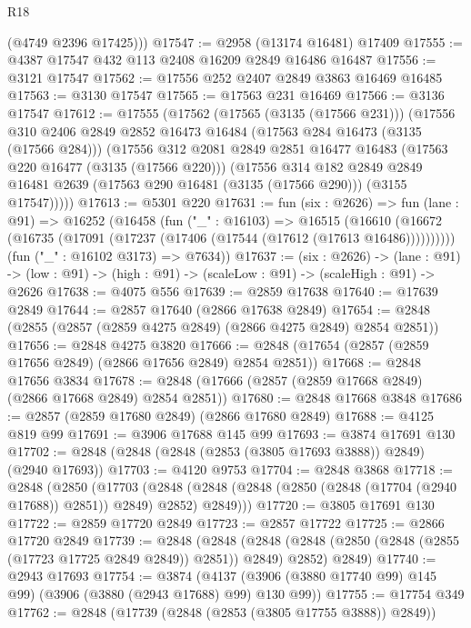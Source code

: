 \begin{lexlean}{R18}
\begin{coremodule}
        (@4749 @2396 @17425)))
@17547 := @2958 (@13174 @16481) @17409
@17555 := @4387 @17547 @432 @113 @2408 @16209 @2849 @16486 @16487
@17556 := @3121 @17547
@17562 := @17556 @252 @2407 @2849 @3863 @16469 @16485
@17563 := @3130 @17547
@17565 := @17563 @231 @16469
@17566 := @3136 @17547
@17612 := @17555
    (@17562
      (@17565 (@3135 (@17566 @231)))
      (@17556
        @310
        @2406
        @2849
        @2852
        @16473
        @16484
        (@17563 @284 @16473 (@3135 (@17566 @284)))
        (@17556
          @312
          @2081
          @2849
          @2851
          @16477
          @16483
          (@17563 @220 @16477 (@3135 (@17566 @220)))
          (@17556
            @314
            @182
            @2849
            @2849
            @16481
            @2639
            (@17563 @290 @16481 (@3135 (@17566 @290)))
            (@3155 @17547)))))
@17613 := @5301 @220
@17631 := fun (six : @2626) =>
  fun (lane : @91) =>
  @16252
    (@16458
      (fun ("_" : @16103) =>
      @16515
        (@16610 (@16672 (@16735 (@17091 (@17237 (@17406 (@17544 (@17612 (@17613 @16486))))))))))
      (fun ("_" : @16102 @3173) => @7634))
@17637 := (six : @2626) ->
  (lane : @91) -> (low : @91) -> (high : @91) -> (scaleLow : @91) -> (scaleHigh : @91) -> @2626
@17638 := @4075 @556
@17639 := @2859 @17638
@17640 := @17639 @2849
@17644 := @2857 @17640 (@2866 @17638 @2849)
@17654 := @2848 (@2855 (@2857 (@2859 @4275 @2849) (@2866 @4275 @2849) @2854 @2851))
@17656 := @2848 @4275 @3820
@17666 := @2848 (@17654 (@2857 (@2859 @17656 @2849) (@2866 @17656 @2849) @2854 @2851))
@17668 := @2848 @17656 @3834
@17678 := @2848 (@17666 (@2857 (@2859 @17668 @2849) (@2866 @17668 @2849) @2854 @2851))
@17680 := @2848 @17668 @3848
@17686 := @2857 (@2859 @17680 @2849) (@2866 @17680 @2849)
@17688 := @4125 @819 @99
@17691 := @3906 @17688 @145 @99
@17693 := @3874 @17691 @130
@17702 := @2848 (@2848 (@2848 (@2853 (@3805 @17693 @3888)) @2849) (@2940 @17693))
@17703 := @4120 @9753
@17704 := @2848 @3868
@17718 := @2848
    (@2850
      (@17703
        (@2848 (@2848 (@2848 (@2850 (@2848 (@17704 (@2940 @17688)) @2851)) @2849) @2852) @2849)))
@17720 := @3805 @17691 @130
@17722 := @2859 @17720 @2849
@17723 := @2857 @17722
@17725 := @2866 @17720 @2849
@17739 := @2848
    (@2848
      (@2848 (@2848 (@2850 (@2848 (@2855 (@17723 @17725 @2849 @2849)) @2851)) @2849) @2852)
      @2849)
@17740 := @2943 @17693
@17754 := @3874
    (@4137 (@3906 (@3880 @17740 @99) @145 @99) (@3906 (@3880 (@2943 @17688) @99) @130 @99))
@17755 := @17754 @349
@17762 := @2848 (@17739 (@2848 (@2853 (@3805 @17755 @3888)) @2849))

\end{coremodule}
\end{lexlean}
